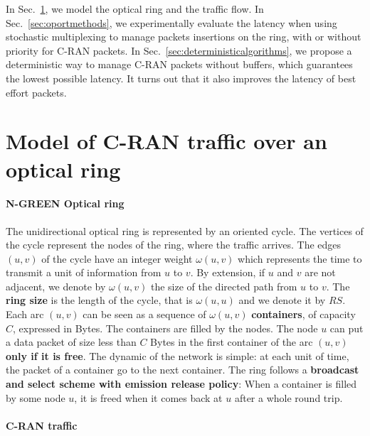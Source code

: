 \documentclass[]{llncs}
\begin{document}
In Sec.~\ref{sec:model}, we model the optical ring and the traffic flow. In Sec.~\ref{sec:oportmethods}, we experimentally evaluate the latency when using stochastic multiplexing to manage packets insertions on the ring, with or without priority for C-RAN packets. In Sec.~\ref{sec:deterministicalgorithms}, we propose a deterministic way to manage C-RAN packets without buffers, which guarantees the lowest possible latency. It turns out that it also improves the latency of best effort packets.

\section{Model of C-RAN traffic over an optical ring}
\label{sec:model}
    
  \paragraph{N-GREEN Optical ring}
   
  The unidirectional optical ring is represented by an oriented cycle. The vertices of the cycle represent the nodes of the ring, where the traffic arrives. The edges $(u,v)$ of the cycle have an integer weight $\omega(u,v)$ which represents the time to transmit a unit of information from $u$ to $v$. By extension, if $u$ and $v$ are not adjacent, we denote by $\omega(u,v)$ the size of the directed path from $u$ to $v$.  The \textbf{ring size} is the length of the cycle, that is $\omega(u,u)$ and we denote it by $RS$.  Each arc $(u,v)$ can be seen as a sequence of $\omega(u,v)$ {\bf containers}, of capacity $C$, expressed in Bytes.  The containers are filled by the nodes. The node $u$ can put a data packet of size less than $C$ Bytes in the first container of the arc $(u,v)$ {\bf only if it is free}. 
  The dynamic of the network is simple: at each unit of time, the packet of a container go to the next container.
   The ring follows a {\bf broadcast and select scheme with emission release policy}: When a container is filled by some node $u$,
   it is freed when it comes back at $u$ after a whole round trip.

   \paragraph{C-RAN traffic}
   
\end{document}

